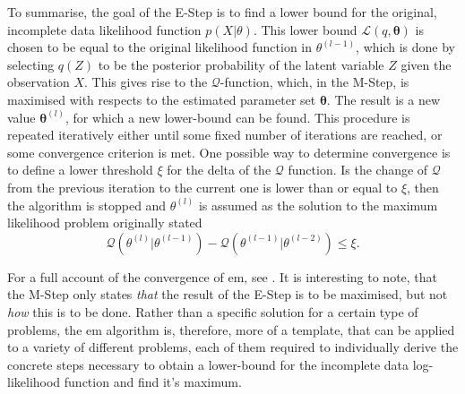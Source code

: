To summarise, the goal of the E-Step is to find a lower bound for the original, incomplete data likelihood function $p(X\vert\theta)$. This lower bound $\mathcal{L}(q,\bm\theta)$ is chosen to be equal to the original likelihood function in $\theta^{(l-1)}$, which is done by selecting $q(Z)$ to be the posterior probability of the latent variable $Z$ given the observation $X$. This gives rise to the $\mathcal{Q}$-function, which, in the M-Step, is maximised with respects to the estimated parameter set $\bm\theta$. The result is a new value $\bm\theta^{(l)}$, for which a new lower-bound can be found. This procedure is repeated iteratively either until some fixed number of iterations are reached, or some convergence criterion is met. One possible way to determine convergence is to define a lower threshold $\xi$ for the delta of the $\mathcal{Q}$ function. Is the change of $\mathcal{Q}$ from the previous iteration to the current one is lower than or equal to $\xi$, then the algorithm is stopped and $\theta^{(l)}$ is assumed as the solution to the maximum likelihood problem originally stated
\begin{equation}
    \mathcal{Q}(\theta^{(l)}\vert\theta^{(l-1)})-\mathcal{Q}(\theta^{(l-1)}\vert\theta^{(l-2)})\leq\xi.
    \label{eq:convergence-check}
\end{equation}

For a full account of the convergence of \gls{em}, see \cite{Wu1983}. It is interesting to note, that the M-Step only states \textit{that} the result of the E-Step is to be maximised, but not \textit{how} this is to be done. Rather than a specific solution for a certain type of problems, the \gls{em} algorithm is, therefore, more of a template, that can be applied to a variety of different problems, each of them required to individually derive the concrete steps necessary to obtain a lower-bound for the incomplete data log-likelihood function and find it's maximum.

